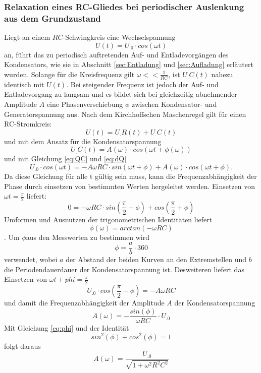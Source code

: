 \subsubsection{Relaxation eines RC-Gliedes bei periodischer Auslenkung aus dem Grundzustand}
Liegt an einem $RC$-Schwingkreis eine Wechselspannung
\[
U(t)= U_.0\cdot cos(\omega t)
\]
an, führt das zu periodisch auftretenden Auf- und Entladevorgängen des Kondensators, wie sie in Abschnitt \ref{sec:Entladung} und \ref{sec:Aufladung} erläutert wurden.
Solange für die Kreisfrequenz gilt $\omega << \frac{1}{RC}$, ist $U_.C(t)$ nahezu identisch mit $U(t)$. Bei steigender Frequenz ist jedoch der Auf- und Entladevorgang zu langsam und es bildet sich bei gleichzeitig abnehmender Amplitude $A$ eine Phasenverschiebung $\phi$ zwischen Kondensator- und Generatorspannung aus.
Nach dem Kirchhoffschen Maschenregel gilt für einen RC-Stromkreis:
\begin{equation}
U(t)=U_.R(t)+U_.C(t)\label{eq:U1}
\end{equation}
und mit dem Ansatz für die Kondensatorspannung
\[
U_.C(t)= A(\omega)\cdot cos(\omega t + \phi (\omega))
\]
und mit Gleichung \eqref{eq:QC} und \eqref{eq:dQ}
\begin{equation}
U_.0\cdot cos(\omega t) = -A\omega RC\cdot sin(\omega t + \phi) + A(\omega)\cdot cos(\omega t + \phi)\text{.}\label{eq:U2}
\end{equation}
Da diese Gleichung für alle t gültig sein muss, kann die Frequenzabhängigkeit der Phase durch einsetzen von bestimmten Werten hergeleitet werden.
Einsetzen von $\omega t=\frac{\pi}{2}$ liefert:
\[
0 = -\omega RC\cdot sin\left(\frac{\pi}{2}+\phi\right)+ cos\left(\frac{\pi}{2}+\phi\right)
\]
Umformen und Ausnutzen der trigonometrischen Identitäten liefert
\begin{equation}
\phi (\omega)= arctan(-\omega RC)\label{eq:phi}
\end{equation}.
Um $\phi$aus den Messwerten zu bestimmen wird
\begin{equation}
\phi = \frac{a}{b}\cdot 360\label{eq:phi1}
\end{equation}
verwendet, wobei $a$ der Abstand der beiden Kurven an den Extremstellen und $b$ die Periodendauerdauer der Kondensatorspannung ist.
Desweiteren liefert das Einsetzen von $\omega t + phi = \frac{\pi}{2}$
\[
U_.0\cdot cos\left(\frac{\pi}{2}-\phi\right)= -A\omega RC
\]
und damit die Frequenzabhängigkeit der Amplitude $A$ der Kondensatorspannung
\begin{equation}
A(\omega)=-\frac{sin(\phi)}{\omega RC}\cdot U_.0\label{eq:A1}
\end{equation}
Mit Gleichung \eqref{eq:phi} und der Identität
\[
sin^2(\phi)+cos^2(\phi)=1
\]
folgt daraus
\begin{equation}
A(\omega)=\frac{U_.0}{\sqrt{1+\omega^2R^2C^2}}\label{eq:A2}
\end{equation}
